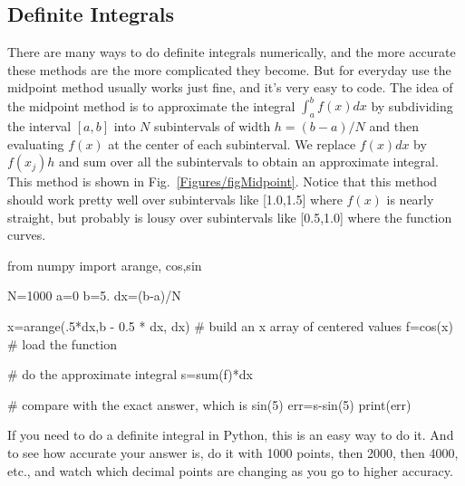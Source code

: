 \subsection*{Definite Integrals}
 There are many ways to do definite integrals
numerically, and the more accurate these methods are the more complicated
they become. But for everyday use the midpoint method usually works just
fine, and it's very easy to code. The idea of the midpoint method is to
approximate the integral $\int_a^b f(x) dx$ by subdividing the interval
$[a,b]$ into $N$ subintervals of width $h = (b-a)/N$ and then evaluating
$f(x)$ at the center of each subinterval. We replace $f(x) dx$ by $f(x_j) h$
and sum over all the subintervals to obtain an approximate integral. This
method is shown in Fig.~\ref{Figures/figMidpoint}. Notice that this method should
work pretty well over subintervals like [1.0,1.5] where $f(x)$ is nearly
straight, but probably is lousy over subintervals like [0.5,1.0] where the
function curves.




\begin{codeexample}
\begin{VerbatimOut}{\listingFile}
from numpy import arange, cos,sin

N=1000
a=0
b=5.
dx=(b-a)/N

x=arange(.5*dx,b - 0.5 * dx, dx)  # build an x array of centered values
f=cos(x)  # load the function

# do the approximate integral
s=sum(f)*dx

# compare with the exact answer, which is sin(5)
err=s-sin(5)
print(err)
\end{VerbatimOut}
\end{codeexample}

If you need to do a definite integral in Python, this is an easy way to do
it. And to see how accurate your answer is, do it with 1000 points, then
2000, then 4000, etc., and watch which decimal points are changing as you go
to higher accuracy.

